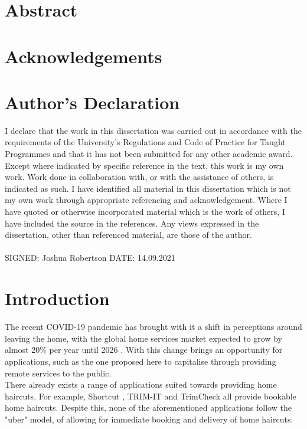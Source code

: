 \documentclass[12pt]{article}
\begin{document}
	\tableofcontents
	\pagebreak

	\section*{Abstract}

	\pagebreak

	\section*{Acknowledgements}
	\pagebreak
	
	\section*{Author's Declaration}

	I declare that the work in this dissertation was carried out in accordance with the 
	requirements of the University’s Regulations and Code of Practice for Taught Programmes 
	and that it has not been submitted for any other academic award.  Except where indicated 
	by specific reference in the text, this work is my own work. Work done in collaboration with, 
	or with the assistance of others, is indicated as such. I have identified all material in this 
	dissertation which is not my own work through appropriate referencing and 
	acknowledgement. Where I have quoted or otherwise incorporated material which is the 
	work of others, I have included the source in the references.  Any views expressed in the 
	dissertation, other than referenced material, are those of the author. 
	\\
	\\
	SIGNED: Joshua Robertson DATE: 14.09.2021 
	\pagebreak
	
	\section{Introduction}


	
	
	The recent COVID-19 pandemic has brought with it a shift in perceptions around leaving the home, with the global home services market expected to grow by almost 20\% per year until 2026 \cite{owen-ray}. With this change brings an opportunity for applications, such as the one proposed here to capitalise through providing remote services to the public. 
	\\
	
	There already exists a range of applications suited towards providing home haircuts. For example, Shortcut \cite{shortcut}, TRIM-IT\cite{trim-it} and TrimCheck\cite{trimcheck} all provide bookable home haircuts. Despite this, none of the aforementioned applications follow the "uber" model, of allowing for immediate booking and delivery of home haircuts. 
	\\
	
\end{document}
